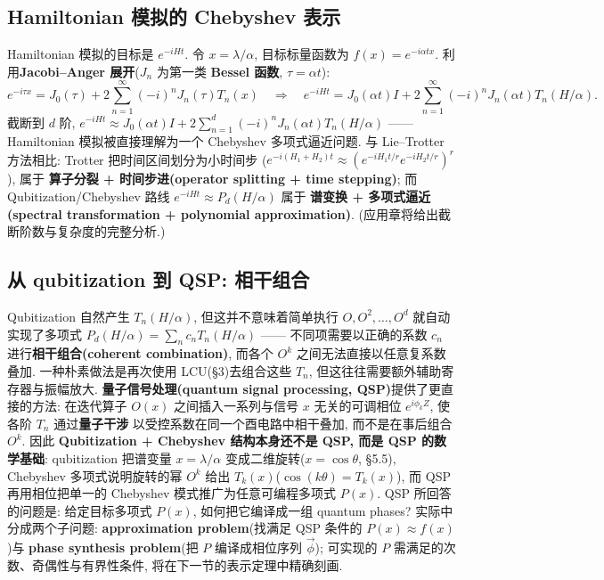 \documentclass[utf8]{article} %
\numberwithin{equation}{section}   %
\begin{document}
\subsection{Hamiltonian 模拟的 Chebyshev 表示}

Hamiltonian 模拟的目标是 $e^{-iHt}$. 令 $x = \lambda/\alpha$, 目标标量函数为
$f(x) = e^{-i\alpha t x}$. 利用\textbf{Jacobi--Anger 展开}($J_n$ 为第一类
\textbf{Bessel 函数}, $\tau = \alpha t$):
\begin{equation}
    e^{-i\tau x} = J_0(\tau) + 2\sum_{n=1}^{\infty} (-i)^n J_n(\tau) T_n(x)
    \quad\Longrightarrow\quad
    e^{-iHt} = J_0(\alpha t) I + 2\sum_{n=1}^{\infty} (-i)^n J_n(\alpha t) T_n(H/\alpha).
\end{equation}
截断到 $d$ 阶, $e^{-iHt} \approx J_0(\alpha t)I + 2\sum_{n=1}^{d} (-i)^n J_n(\alpha t) T_n(H/\alpha)$ ——
Hamiltonian 模拟被直接理解为一个 Chebyshev 多项式逼近问题. 与 Lie--Trotter 方法相比:
Trotter 把时间区间划分为小时间步
($e^{-i(H_1+H_2)t} \approx (e^{-iH_1t/r}e^{-iH_2t/r})^r$), 属于
\textbf{算子分裂 + 时间步进(operator splitting + time stepping)};
而 Qubitization/Chebyshev 路线 $e^{-iHt} \approx P_d(H/\alpha)$ 属于
\textbf{谱变换 + 多项式逼近(spectral transformation + polynomial approximation)}.
(应用章将给出截断阶数与复杂度的完整分析.)

\subsection{从 qubitization 到 QSP: 相干组合}

Qubitization 自然产生 $T_n(H/\alpha)$, 但这并不意味着简单执行 $O, O^2, \dots, O^d$
就自动实现了多项式 $P_d(H/\alpha) = \sum_n c_n T_n(H/\alpha)$ —— 不同项需要以正确的系数
$c_n$ 进行\textbf{相干组合(coherent combination)}, 而各个 $O^k$ 之间无法直接以任意复系数叠加.
一种朴素做法是再次使用 LCU(§3)去组合这些 $T_n$, 但这往往需要额外辅助寄存器与振幅放大.
\textbf{量子信号处理(quantum signal processing, QSP)}提供了更直接的方法: 在迭代算子 $O(x)$
之间插入一系列与信号 $x$ 无关的可调相位 $e^{i\phi_k Z}$, 使各阶 $T_n$ 通过\textbf{量子干涉}
以受控系数在同一个酉电路中相干叠加, 而不是在事后组合 $O^k$. 因此
\textbf{Qubitization + Chebyshev 结构本身还不是 QSP, 而是 QSP 的数学基础}:
qubitization 把谱变量 $x = \lambda/\alpha$ 变成二维旋转($x = \cos\theta$, §5.5),
Chebyshev 多项式说明旋转的幂 $O^k$ 给出 $T_k(x)$($\cos(k\theta) = T_k(x)$),
而 QSP 再用相位把单一的 Chebyshev 模式推广为任意可编程多项式 $P(x)$.
QSP 所回答的问题是: 给定目标多项式 $P(x)$, 如何把它编译成一组 quantum phases?
实际中分成两个子问题: \textbf{approximation problem}(找满足 QSP 条件的 $P(x) \approx f(x)$)与
\textbf{phase synthesis problem}(把 $P$ 编译成相位序列 $\vec\phi$);
可实现的 $P$ 需满足的次数、奇偶性与有界性条件, 将在下一节的表示定理中精确刻画.
\end{document}
